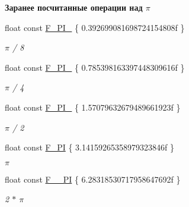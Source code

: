 \begin{Indent}\textbf{ Заранее посчитанные операции над {$\pi$}}\par
\begin{DoxyCompactItemize}
\item 
\mbox{\label{namespacertm_a7b6dbeacd7031c85947cce8529d19b0d}} 
float const \hyperlink{namespacertm_a7b6dbeacd7031c85947cce8529d19b0d}{F\+\_\+\+P\+I\+\_} \{ 0.\+392699081698724154808f \}
\begin{DoxyCompactList}\small\item\em {$\pi$} / 8 \end{DoxyCompactList}\item 
\mbox{\label{namespacertm_a5d5e98851be43c6884812bf293b09184}} 
float const \hyperlink{namespacertm_a5d5e98851be43c6884812bf293b09184}{F\+\_\+\+P\+I\+\_} \{ 0.\+785398163397448309616f \}
\begin{DoxyCompactList}\small\item\em {$\pi$} / 4 \end{DoxyCompactList}\item 
\mbox{\label{namespacertm_ae9fd4cc21cfc9e2331c1a9c3370aea30}} 
float const \hyperlink{namespacertm_ae9fd4cc21cfc9e2331c1a9c3370aea30}{F\+\_\+\+P\+I\+\_} \{ 1.\+57079632679489661923f \}
\begin{DoxyCompactList}\small\item\em {$\pi$} / 2 \end{DoxyCompactList}\item 
\mbox{\label{namespacertm_ae15880ada663d5427ba0d78437ee5c26}} 
float const \hyperlink{namespacertm_ae15880ada663d5427ba0d78437ee5c26}{F\+\_\+\+PI} \{ 3.\+14159265358979323846f \}
\begin{DoxyCompactList}\small\item\em {$\pi$} \end{DoxyCompactList}\item 
\mbox{\label{namespacertm_aecb3b230449fee3137e44125ab9ca20d}} 
float const \hyperlink{namespacertm_aecb3b230449fee3137e44125ab9ca20d}{F\+\_\+\_\+\+PI} \{ 6.\+28318530717958647692f \}
\begin{DoxyCompactList}\small\item\em 2 $\ast$ {$\pi$} \end{DoxyCompactList}\end{DoxyCompactItemize}
\end{Indent}
